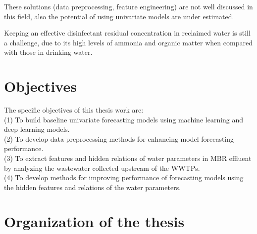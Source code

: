 These solutions (data preprocessing, feature engineering) are not well discussed in this field, also the 
potential of using univariate models are under estimated.

Keeping an effective disinfectant residual concentration in reclaimed water is still a challenge, due to its high levels of ammonia and organic matter when compared with those in drinking water. \citep{costaIdentificationModellingChlorine2021}



\section{Objectives}
\noindent
The specific objectives of this thesis work are:\\
(1) To build baseline univariate forecasting models using machine learning and deep learning models.\\
(2) To develop data preprocessing methods for enhancing model forecasting performance.\\
(3) To extract features and hidden relations of water parameters in MBR effluent by analyzing the wastewater collected upstream of the WWTPs.\\
(4) To develop methods for improving performance of forecasting models using the hidden features and relations of the water parameters.

\section{Organization of the thesis}
